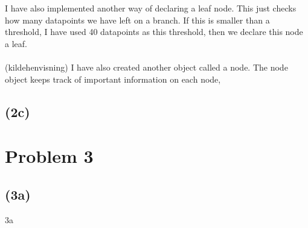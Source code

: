 \documentclass[12pt, letterpaper]{article}
\begin{document}
      I have also implemented another way of declaring a leaf node. This just checks how many datapoints we have left on a branch. If this is smaller than a threshold, I have used 40 datapoints as this threshold, then we declare this node a leaf.\\
      \\
      (kildehenvisning)
      I have also created another object called a node. The node object keeps track of important information on each node, 
    \subsection*{(2c)}
  \section*{Problem 3}
    \subsection*{(3a)}
      3a
\end{document}
